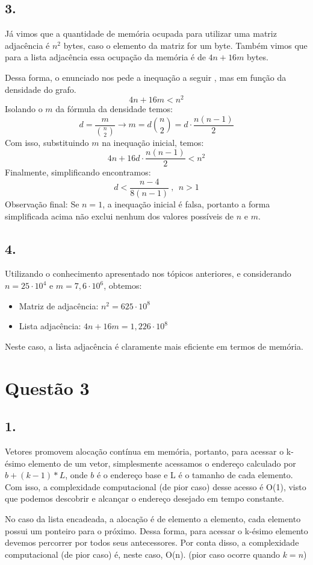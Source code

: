 \documentclass[a4paper,openright, 12pt]{article}
\begin{document}
\subsection*{3.}
Já vimos que a quantidade de memória ocupada para utilizar uma matriz adjacência é $n^{2}$ bytes, caso o elemento da matriz for um byte. Também vimos que para a lista adjacência essa ocupação da memória é de $4n + 16m$ bytes. \par
Dessa forma, o enunciado nos pede a inequação a seguir , mas em função da densidade do grafo. 
\[4n+16m < n^{2}\]
Isolando o $m$ da fórmula da densidade temos:
\[d= \frac{m}{ {n \choose 2}} \longrightarrow m = d {n \choose 2} = d \cdot \frac{n(n-1)}{2} \]
Com isso, substituindo $m$ na inequação inicial, temos:
\[4n+16d \cdot \frac{n(n-1)}{2} < n^{2}\]
Finalmente, simplificando encontramos:
\[d < \frac{n-4}{8(n-1)} \: ,\ \ n > 1\]
Observação final: Se $n=1$, a inequação inicial é falsa, portanto a forma simplificada acima não exclui nenhum dos valores possíveis de $n$ e $m$. 

\subsection*{4.}
Utilizando o conhecimento apresentado nos tópicos anteriores, e considerando $n = 25 \cdot 10^{4}$ e $m = 7,6 \cdot 10^{6}$, obtemos:
\begin{itemize}
    \item Matriz de adjacência: $n^{2}= 625 \cdot 10^{8}$
    \item Lista adjacência: $4n+16m = 1,226 \cdot 10^{8}$
\end{itemize}
Neste caso, a lista adjacência é claramente mais eficiente em termos de memória.

\section*{Questão 3}
\subsection*{1.}
Vetores promovem alocação contínua em memória, portanto, para acessar o k-ésimo elemento de um vetor, simplesmente acessamos o endereço calculado por $b+(k-1)*L$, onde $b$ é o endereço base e L é o tamanho de cada elemento. Com isso, a complexidade computacional (de pior caso) desse acesso é O(1), visto que podemos descobrir e alcançar o endereço desejado em tempo constante. \par
No caso da lista encadeada, a alocação é de elemento a elemento, cada elemento possui um ponteiro para o próximo. Dessa forma, para acessar o k-ésimo elemento devemos percorrer por todos seus antecessores. Por conta disso, a complexidade computacional (de pior caso) é, neste caso, O(n). (pior caso ocorre quando $k=n$)
\end{document}
